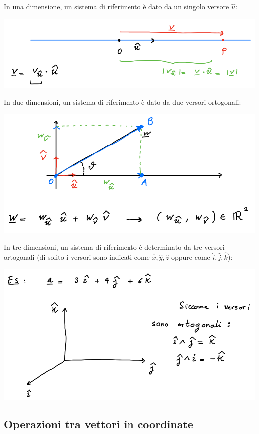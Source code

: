 \documentclass{subfiles}
\begin{document}
\noindent
In una dimensione, un sistema di riferimento è dato da un singolo versore $\hat{u}$:

\includegraphics[width=\columnwidth]{vettori-e-coordinate-una-dimensione}

\noindent
In due dimensioni, un sistema di riferimento è dato da due versori ortogonali:

\includegraphics[width=\columnwidth]{vettori-e-coordinate-due-dimensioni}

\noindent
In tre dimensioni, un sistema di riferimento è determinato da tre versori ortogonali (di solito i versori sono indicati come $\hat{x}, \hat{y}, \hat{z}$ oppure come $\hat{i}, \hat{j}, \hat{k}$):

\includegraphics[width=\columnwidth]{vettori-e-coordinate-tre-dimensioni}

\subsection{Operazioni tra vettori in coordinate}
\end{document}

